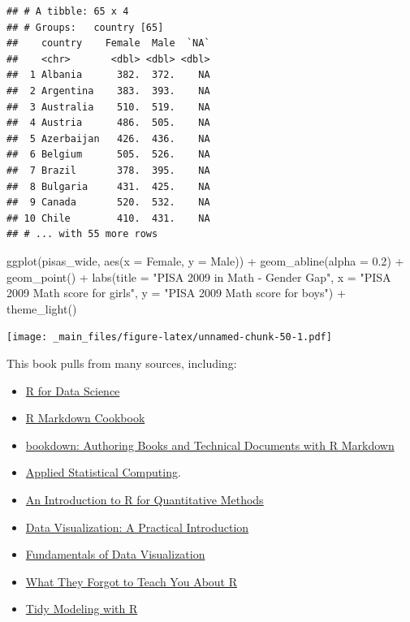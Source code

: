 \documentclass[
]{book}
\newenvironment{Shaded}{\begin{snugshade}}{\end{snugshade}}
\newcommand{\AttributeTok}[1]{\textcolor[rgb]{0.77,0.63,0.00}{#1}}
\newcommand{\FloatTok}[1]{\textcolor[rgb]{0.00,0.00,0.81}{#1}}
\newcommand{\FunctionTok}[1]{\textcolor[rgb]{0.00,0.00,0.00}{#1}}
\newcommand{\NormalTok}[1]{#1}
\newcommand{\SpecialCharTok}[1]{\textcolor[rgb]{0.00,0.00,0.00}{#1}}
\newcommand{\StringTok}[1]{\textcolor[rgb]{0.31,0.60,0.02}{#1}}
\begin{document}
\begin{verbatim}
## # A tibble: 65 x 4
## # Groups:   country [65]
##    country    Female  Male  `NA`
##    <chr>       <dbl> <dbl> <dbl>
##  1 Albania      382.  372.    NA
##  2 Argentina    383.  393.    NA
##  3 Australia    510.  519.    NA
##  4 Austria      486.  505.    NA
##  5 Azerbaijan   426.  436.    NA
##  6 Belgium      505.  526.    NA
##  7 Brazil       378.  395.    NA
##  8 Bulgaria     431.  425.    NA
##  9 Canada       520.  532.    NA
## 10 Chile        410.  431.    NA
## # ... with 55 more rows
\end{verbatim}

\begin{Shaded}
\begin{Highlighting}[]
\FunctionTok{ggplot}\NormalTok{(pisas\_wide, }\FunctionTok{aes}\NormalTok{(}\AttributeTok{x =}\NormalTok{ Female, }\AttributeTok{y =}\NormalTok{ Male)) }\SpecialCharTok{+}
  \FunctionTok{geom\_abline}\NormalTok{(}\AttributeTok{alpha =} \FloatTok{0.2}\NormalTok{) }\SpecialCharTok{+}
  \FunctionTok{geom\_point}\NormalTok{() }\SpecialCharTok{+}
  \FunctionTok{labs}\NormalTok{(}\AttributeTok{title =} \StringTok{"PISA 2009 in Math {-} Gender Gap"}\NormalTok{,}
       \AttributeTok{x =} \StringTok{"PISA 2009 Math score for girls"}\NormalTok{,}
       \AttributeTok{y =} \StringTok{"PISA 2009 Math score for boys"}\NormalTok{) }\SpecialCharTok{+}
  \FunctionTok{theme\_light}\NormalTok{()}
\end{Highlighting}
\end{Shaded}

\texttt{[image: \_main\_files/figure-latex/unnamed-chunk-50-1.pdf]}

This book pulls from many sources, including:

\begin{itemize}
\item
  \href{https://r4ds.had.co.nz/}{R for Data Science}
\item
  \href{https://bookdown.org/yihui/rmarkdown-cookbook/}{R Markdown Cookbook}
\item
  \href{https://bookdown.org/yihui/bookdown/}{bookdown: Authoring Books and Technical Documents with R Markdown}
\item
  \href{https://stat480-at-isu.github.io/schedule.html}{Applied Statistical Computing}.
\item
  \href{https://people.stat.sc.edu/habing/RforQM/RforQM.htm}{An Introduction to R for Quantitative Methods}
\item
  \href{https://socviz.co/}{Data Visualization: A Practical Introduction}
\item
  \href{https://clauswilke.com/dataviz/index.html}{Fundamentals of Data Visualization}
\item
  \href{https://rstats.wtf/}{What They Forgot to Teach You About R}
\item
  \href{https://www.tmwr.org/}{Tidy Modeling with R}
\end{itemize}
\end{document}
